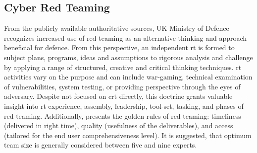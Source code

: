 \subsection{Cyber Red Teaming}
\label{sec:crt-work}
\glsresetall
From the publicly available authoritative sources, UK Ministry of Defence \cite{UK2013} recognizes increased use of red teaming as an alternative thinking and approach beneficial for defence. From this perspective, an independent \gls{rt} is formed to subject plans, programs, ideas and assumptions to rigorous analysis and challenge by applying a range of structured, creative and critical thinking techniques. \gls{rt} activities vary on the purpose and can include war-gaming, technical examination of vulnerabilities, system testing, or providing perspective through the eyes of adversary. Despite not focused on \gls{crt} directly, this doctrine grants valuable insight into \gls{rt} experience, assembly, leadership, tool-set, tasking, and phases of red teaming. Additionally, presents the golden rules of red teaming: timeliness (delivered in right time), quality (usefulness of the deliverables), and access (tailored for the end user comprehensiveness level). It is suggested, that optimum team size is generally considered between five and nine experts.
%
%
%
%

